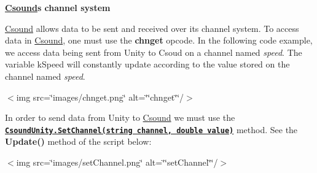 \begin{DoxyCode}{0}
\DoxyCodeLine{}
\DoxyCodeLine{\{}
\DoxyCodeLine{\}}
\DoxyCodeLine{}
\DoxyCodeLine{\{}
\DoxyCodeLine{\}}
\DoxyCodeLine{}
\DoxyCodeLine{\textcolor{comment}{// Update is called once per frame}}
\DoxyCodeLine{\{}
\DoxyCodeLine{}
\DoxyCodeLine{    \textcolor{comment}{// your code}}
\DoxyCodeLine{\}}

\end{DoxyCode}


{\bfseries{\mbox{\hyperlink{namespace_csound}{Csound}}\textquotesingle{}s channel system}}

\mbox{\hyperlink{namespace_csound}{Csound}} allows data to be sent and received over its channel system. To access data in \mbox{\hyperlink{namespace_csound}{Csound}}, one must use the {\bfseries{chnget}} opcode. In the following code example, we access data being sent from Unity to Csoud on a channel named {\itshape speed}. The variable k\+Speed will constantly update according to the value stored on the channel named {\itshape speed}.

\texorpdfstring{$<$}{<}img src=\char`\"{}images/chnget.\+png\char`\"{} alt=\char`\"{}\char`\"{}chnget\char`\"{}\char`\"{}/\texorpdfstring{$>$}{>}

In order to send data from Unity to \mbox{\hyperlink{namespace_csound}{Csound}} we must use the \href{https://github.com/rorywalsh/CsoundUnity/blob/c288e9054c39f8bb0e200f6a67338f6d2dbc6837/Runtime/CsoundUnity.cs\#L750}{\texttt{ {\bfseries{Csound\+Unity.\+Set\+Channel(string channel, double value)}}}} method. See the {\bfseries{Update()}} method of the script below\+:

\texorpdfstring{$<$}{<}img src=\char`\"{}images/set\+Channel.\+png\char`\"{} alt=\char`\"{}\char`\"{}set\+Channel\char`\"{}\char`\"{}/\texorpdfstring{$>$}{>}

